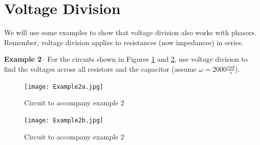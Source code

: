 \documentclass{handout}
\begin{document}
\newpage
\clearpage
\pagebreak
\section{Voltage Division}
We will use some examples to show that voltage division also works with phasors.  Remember, voltage division applies to resistances (now impedances) in series.

\textbf{Example 2}-- For the circuits shown in Figures \ref{fig: Example2a} and \ref{fig: Example2b}, use voltage division to find the voltages across all resistors and the capacitor (assume $\omega = 2000 \frac{rad}{s}$).

\begin{figure} [h!]
\centering
\texttt{[image: Example2a.jpg]}
\caption{Circuit to accompany example 2}
\label{fig: Example2a}
\end{figure}
\begin{figure} [h!]
\centering
\texttt{[image: Example2b.jpg]}
\caption{Circuit to accompany example 2}
\label{fig: Example2b}
\end{figure}

\end{document}
